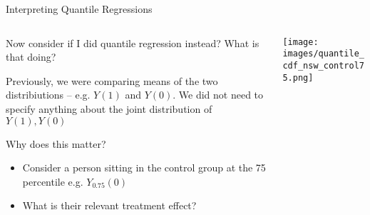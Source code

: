 \documentclass[notes,11pt, aspectratio=169]{beamer}
\newenvironment{wideitemize}{\itemize\addtolength{\itemsep}{10pt}}{\enditemize}
\begin{document}
\begin{frame}{Interpreting Quantile Regressions}
  \begin{columns}[T] %
    \begin{column}{.5\textwidth}
      \begin{wideitemize}
      \item Now consider if I did quantile regression instead? What is
        that doing?
      \item Previously, we were comparing means of the two
        distribiutions -- e.g. $Y(1)$ and $Y(0)$.  We did not need to
        specify anything about the joint distribution of $Y(1),Y(0)$
      \item Why does this matter?
        \begin{itemize}
        \item Consider a person sitting in the control group at the 75
          percentile e.g. $Y_{0.75}(0)$
        \item What is their relevant treatment effect?
        \end{itemize}
      \end{wideitemize}
    \end{column}%
    \hfill%
    \begin{column}{.5\textwidth}
      \texttt{[image: images/quantile\_cdf\_nsw\_control75.png]}
    \end{column}
  \end{columns}
\end{frame}
\end{document}
